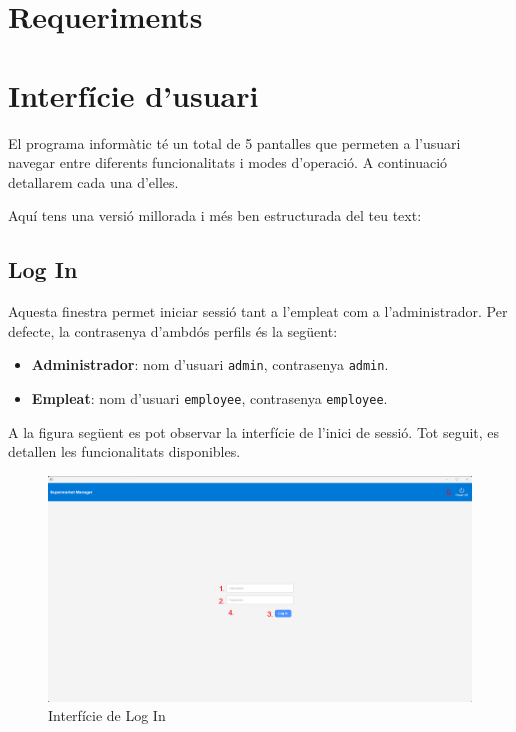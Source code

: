 \documentclass[a4paper,12pt]{article}
\begin{document}
	\section{Requeriments}
	
	\newpage
	\section{Interfície d'usuari}
	
	El programa informàtic té un total de 5 pantalles que permeten a l'usuari navegar entre diferents funcionalitats i modes d'operació. A continuació detallarem cada una d'elles.
	
	
	Aquí tens una versió millorada i més ben estructurada del teu text:
	
	\subsection{Log In}
	\label{sec:logIn}
	
	Aquesta finestra permet iniciar sessió tant a l'empleat com a l'administrador. Per defecte, la contrasenya d'ambdós perfils és la següent:
	
	\begin{itemize}
		\item \textbf{Administrador}: nom d'usuari \texttt{admin}, contrasenya \texttt{admin}.
		\item \textbf{Empleat}: nom d'usuari \texttt{employee}, contrasenya \texttt{employee}.
	\end{itemize}
	
	A la figura següent es pot observar la interfície de l'inici de sessió. Tot seguit, es detallen les funcionalitats disponibles.
	
	\begin{figure}[H] 
		\centering
		\includegraphics[width=0.75\linewidth]{assets/login.png}
		\caption{Interfície de Log In}
	\end{figure}
	
\end{document}
